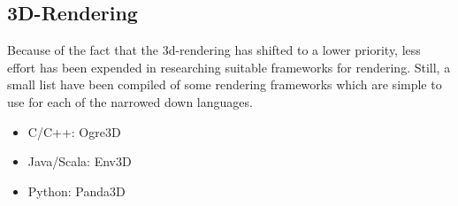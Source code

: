 \subsection{3D-Rendering}
Because of the fact that the 3d-rendering has shifted to a lower priority, less effort has been expended in researching suitable frameworks for rendering. Still, a small list have been compiled of some rendering frameworks which are simple to use for each of the narrowed down languages.
\begin{itemize}
	\item C/C++: Ogre3D
	\item Java/Scala: Env3D
	\item Python: Panda3D
\end{itemize}
	